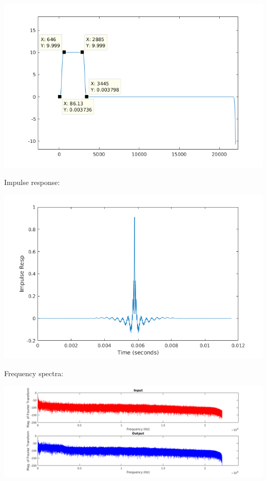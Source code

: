 \documentclass[titlepage]{article}
\begin{document}
\begin{center}
\includegraphics[width=.9\linewidth]{fr_b.png}
\end{center}

Impulse response:

\begin{center}
\includegraphics[width=.9\linewidth]{ir_b.png}
\end{center}

Frequency spectra:

\begin{center}
\includegraphics[width=.9\linewidth]{fs_b.png}
\end{center}
\end{document}
